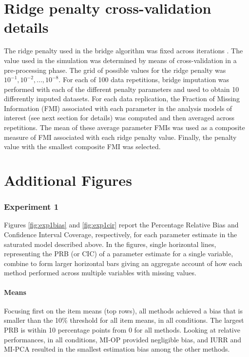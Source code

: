 \documentclass[]{./cls/interact}
\theoremstyle{plain}
\theoremstyle{definition}
\theoremstyle{remark}
\begin{document}
\section{Ridge penalty cross-validation details}
	The ridge penalty used in the bridge algorithm was fixed across iterations .
	The value used in the simulation was determined by means of cross-validation in a pre-processing phase.
	The grid of possible values for the ridge penalty was $10^{-1}, 10^{-2}, ..., 10^{-8}$.
	For each of 100 data repetitions, bridge imputation was performed with each of the different penalty parameters
	and used to obtain 10 differently imputed datasets.
	For each data replication, the Fraction of Missing Information (FMI) \citep{savaleiRhemtulla:2012} associated with 
	each parameter in the analysis models of interest (see next section for details) was computed and then averaged across 
	repetitions.
	The mean of these average parameter FMIs was used as a composite measure of FMI associated with each ridge penalty
	value.
	Finally, the penalty value with the smallest composite FMI was selected.

\section{Additional Figures}

\subsubsection{Experiment 1}

	Figures \ref{fig:exp1bias} and \ref{fig:exp1cir} report the Percentage Relative Bias and Confidence Interval 
	Coverage, respectively, for each parameter estimate in the saturated model described above. 
	In the figures, single horizontal lines, representing the PRB (or CIC) of a parameter estimate for a single 
	variable, combine to form larger horizontal bars giving an aggregate account of how each method performed 
	across multiple variables with missing values.

	\paragraph{Means} 
	Focusing first on the item means (top rows), all methods achieved a bias that is smaller than the 10\% threshold 
	for all item means, in all conditions.
	The largest PRB is within 10 percentage points from 0 for all methods.
	Looking at relative performances, in all conditions, MI-OP provided negligible bias, and IURR and MI-PCA resulted 
	in the smallest estimation bias among the other methods.
	
\end{document}
